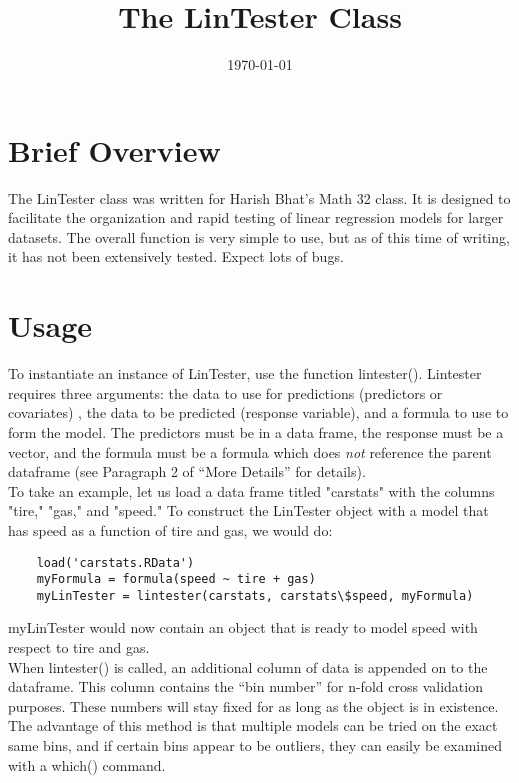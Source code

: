 \documentclass[12pt,letterpaper]{article}
\begin{document}
\title{The LinTester Class}
\date{\today}
\maketitle

\section*{Brief Overview}
The LinTester class was written for Harish Bhat's Math 32 class. It is designed to facilitate the organization and rapid testing of
linear regression models for larger datasets. The overall function is very simple to use, but as of this time of writing, it
has not been extensively tested. Expect lots of bugs.

\section*{Usage}

To instantiate an instance of LinTester, use the function lintester(). Lintester requires three arguments: the data to use for predictions (predictors or covariates)
, the data to be predicted (response variable), and a formula to use to form the model. The predictors must be in a data frame, the response must be a vector, and the formula must be a formula which does \textit{not} reference the parent dataframe (see Paragraph 2 of ``More Details'' for details).\\

To take an example, let us load a data frame titled "carstats" with the columns "tire," "gas," and "speed." To construct the LinTester object with 
a model that has speed as a function of tire and gas, we would do:

\begin{verbatim}
	load('carstats.RData')
	myFormula = formula(speed ~ tire + gas)
	myLinTester = lintester(carstats, carstats\$speed, myFormula)
\end{verbatim}

myLinTester would now contain an object that is ready to model speed with respect to tire and gas.\\

When lintester() is called, an additional column of data is appended on to the dataframe. This column contains the ``bin number'' for n-fold cross validation purposes.
These numbers will stay fixed for as long as the object is in existence. The advantage of this method is that multiple models can be tried on the exact same bins, and if
certain bins appear to be outliers, they can easily be examined with a which() command.\\
\end{document}
